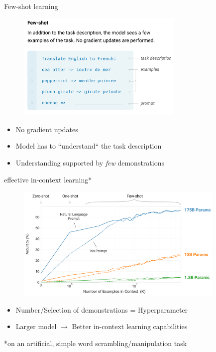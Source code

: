 \begin{vbframe}{Few-shot learning}

\vfill

	\begin{figure}
		\centering
		\includegraphics[width=8cm]{figure/gptfewshot.png}\\
	\end{figure}

\begin{itemize}
	\item No gradient updates
	\item Model has to ``understand`` the task description
	\item Understanding supported by \textit{few} demonstrations
\end{itemize}

\vfill

\end{vbframe}


\begin{vbframe}{effective in-context learning*}
	
\vfill
	
\begin{figure}
		\centering
		\includegraphics[width=10cm]{figure/incontextlearning.png}\\
\end{figure}

\begin{itemize}
	\item Number/Selection of demonstrations = Hyperparameter
	\item Larger model $\to$ Better in-context learning capabilities
\end{itemize}

\vfill

\scriptsize{*on an artificial, simple word scrambling/manipulation task}

\end{vbframe}

